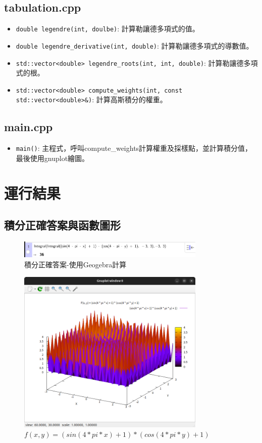 \documentclass[a4paper,12pt]{article}
\begin{document}
\subsection{tabulation.cpp}
\begin{itemize}
    \item \texttt{double legendre(int, doulbe)}: 計算勒讓德多項式的值。
    \item \texttt{double legendre\_derivative(int, double)}: 計算勒讓德多項式的導數值。
    \item \texttt{std::vector<double> legendre\_roots(int, int, double)}: 計算勒讓德多項式的根。
    \item \texttt{std::vector<double> compute\_weights(int, const std::vector<double>&)}: 計算高斯積分的權重。 
\end{itemize}

\subsection{main.cpp}
\begin{itemize}
    \item \texttt{main()}: 主程式，呼叫compute\_weights計算權重及採樣點，並計算積分值，最後使用gnuplot繪圖。
\end{itemize}


\section{運行結果}

\subsection{積分正確答案與函數圖形}
\begin{figure}[H]
    \centering
    \includegraphics[width=0.8\textwidth]{./img/ggb_integral.png}
    \caption{積分正確答案-使用Geogebra計算}
\end{figure}
\begin{figure}[H]
    \centering
    \includegraphics[width=0.8\textwidth]{./img/func_image.png}
    \caption{$f(x,y) = (sin(4 * pi * x) + 1) * (cos(4 * pi * y) + 1)$}
\end{figure}
\end{document}
